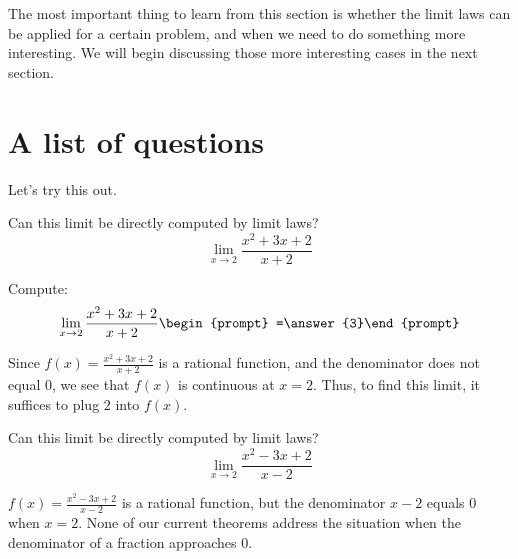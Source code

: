 \documentclass{ximera}
\begin{document}
The most important thing to learn from this section is whether the
limit laws can be applied for a certain problem, and when we need to
do something more interesting.  We will begin discussing those more
interesting cases in the next section.  
\section{A list of questions}

Let's try this out.

\begin{question}
  Can this limit be directly computed by limit laws?
  \[
  \lim_{x\to 2}\frac{x^2+3x+2}{x+2} 
  \]
  \begin{prompt}
  \begin{multipleChoice}
  \end{multipleChoice}
  \begin{question}
    Compute:
    \[
    \lim_{x\to 2}\frac{x^2+3x+2}{x+2}\begin{prompt} =\answer{3}\end{prompt}
    \]
    \begin{feedback}
      Since $f(x)=\frac{x^2+3x+2}{x+2}$ is a rational function, and
      the denominator does not equal $0$, we see that $f(x)$ is
      continuous at $x=2$.  Thus, to find this limit, it suffices to
      plug $2$ into $f(x)$.
    \end{feedback}
  \end{question}
  \end{prompt}
\end{question}


\begin{question}
  Can this limit be directly computed by limit laws?
  \[
  \lim_{x\to 2}\frac{x^2-3x+2}{x-2}
  \]
  \begin{prompt}
  \begin{multipleChoice}
  \end{multipleChoice}
  \begin{feedback}
    $f(x) = \frac{x^2-3x+2}{x-2}$ is a rational function, but the
    denominator $x-2$ equals $0$ when $x=2$. None of our current
    theorems address the situation when the denominator of a fraction
    approaches $0$.
  \end{feedback}
  \end{prompt}
\end{question}
\end{document}
